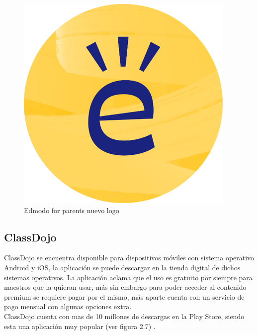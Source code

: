             \begin{figure}[H]
                \centering
                \includegraphics[scale=0.2]{Propuesta_Plantilla_Tesis_LaTeX_UAG/imagenes/edmodo.png}
                \caption{Edmodo for parents nuevo logo}
                \label{fig:edmodo}
            \end{figure}


        \subsection{ClassDojo}
        
            ClassDojo se encuentra disponible para dispositivos móviles con sistema operativo Android y iOS, la aplicación se puede descargar en la tienda digital de dichos sistemas operativos. La aplicación aclama que el uso es gratuito por siempre para maestros que la quieran usar, más sin embargo para poder acceder al contenido premium se requiere pagar por el mismo, más aparte cuenta con un servicio de pago mensual con algunas opciones extra. \\ ClassDojo cuenta con mas de 10 millones de descargas en la Play Store, siendo esta una aplicación muy popular (ver figura 2.7) \cite{classdojo}. 
            
